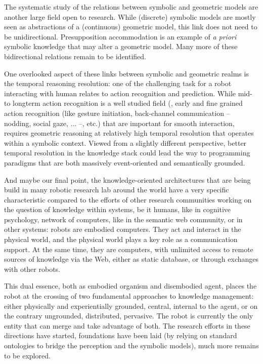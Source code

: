 The systematic study of the relations between symbolic and geometric models are
another large field open to research. While (discrete) symbolic models are
mostly seen as abstractions of a (continuous) geometric model, this link does
not need to be unidirectional. Presupposition accommodation is an example of
{\it a priori} symbolic knowledge that may alter a geometric model. Many more
of these bidirectional relations remain to be identified.

One overlooked aspect of these links between symbolic and geometric realms is
the temporal reasoning resolution: one of the challenging task for a robot
interacting with human relates to action recognition and prediction. While mid-
to longterm action recognition is a well studied field (\cite{Ghallab1996,
Johnson2005, Tenorth2011}, early and fine grained action recognition (like
gesture initiation, back-channel communication -- nodding, social gaze, ... --,
etc.) that are important for smooth interaction, requires geometric reasoning
at relatively high temporal resolution that operates within a symbolic context.
Viewed from a slightly different perspective, better temporal resolution in the
knowledge stack could lead the way to programming paradigms that are both
massively event-oriented and semantically grounded.

\par

And maybe our final point, the knowledge-oriented architectures that are being
build in many robotic research lab around the world have a very specific
characteristic compared to the efforts of other research communities working on
the question of knowledge within systems, be it humans, like in cognitive
psychology, network of computers, like in the semantic web community, or in
other systems: robots are embodied computers. They act and interact in the
physical world, and the physical world plays a key role as a communication
support. At the same time, they are computers, with unlimited access to remote
sources of knowledge via the Web, either as static database, or through
exchanges with other robots.

This dual essence, both as embodied organism and disembodied agent, places the
robot at the crossing of two fundamental approaches to knowledge management:
either physically and experientially grounded, central, internal to the agent,
or on the contrary ungrounded, distributed, pervasive. The robot is currently
the only entity that can merge and take advantage of both. The research efforts
in these directions have started, foundations have been laid (by relying on
standard ontologies to bridge the perception and the symbolic models), much
more remains to be explored.





